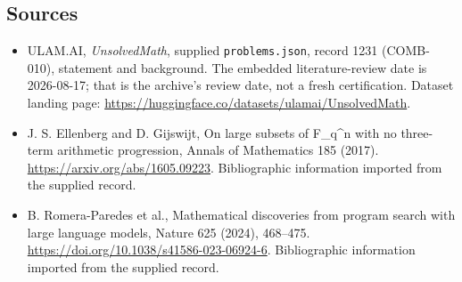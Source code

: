 \documentclass[11pt,a4paper]{article}
\begin{document}
\subsection{Sources}

{\small

\begin{itemize}

\item[\hypertarget{source:1231:1}{S1}] ULAM.AI, \emph{UnsolvedMath}, supplied \texttt{problems.json}, record 1231 (COMB-010), statement and background. The embedded literature-review date is 2026-08-17; that is the archive’s review date, not a fresh certification. Dataset landing page: \url{https://huggingface.co/datasets/ulamai/UnsolvedMath}.

\item[\hypertarget{source:1231:2}{S2}] J. S. Ellenberg and D. Gijswijt, On large subsets of F\_q\textasciicircum{}n with no three-term arithmetic progression, Annals of Mathematics 185 (2017). \url{https://arxiv.org/abs/1605.09223}. Bibliographic information imported from the supplied record.

\item[\hypertarget{source:1231:3}{S3}] B. Romera-Paredes et al., Mathematical discoveries from program search with large language models, Nature 625 (2024), 468–475. \url{https://doi.org/10.1038/s41586-023-06924-6}. Bibliographic information imported from the supplied record.

\end{itemize}

}

\label{end:1231}
\end{document}
